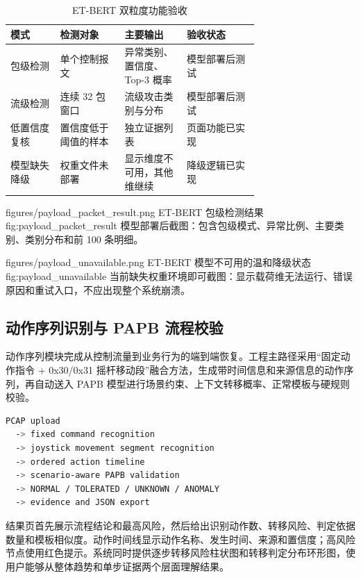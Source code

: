 \begin{table}[H]
\centering
\caption{ET-BERT 双粒度功能验收}
\label{tab:etbert_function}
\small
\begin{tabularx}{\linewidth}{p{0.20\linewidth}p{0.26\linewidth}p{0.25\linewidth}X}
\toprule
\textbf{模式} & \textbf{检测对象} & \textbf{主要输出} & \textbf{验收状态} \\
\midrule
包级检测 & 单个控制报文 & 异常类别、置信度、Top-3 概率 & 模型部署后测试 \\
流级检测 & 连续 32 包窗口 & 流级攻击类别与分布 & 模型部署后测试 \\
低置信度复核 & 置信度低于阈值的样本 & 独立证据列表 & 页面功能已实现 \\
模型缺失降级 & 权重文件未部署 & 显示维度不可用，其他维继续 & 降级逻辑已实现 \\
\bottomrule
\end{tabularx}
\end{table}

\RobotSecFigure
  {figures/payload_packet_result.png}
  {ET-BERT 包级检测结果}
  {fig:payload_packet_result}
  {模型部署后截图：包含包级模式、异常比例、主要类别、类别分布和前 100 条明细。}

\RobotSecFigure
  {figures/payload_unavailable.png}
  {ET-BERT 模型不可用的温和降级状态}
  {fig:payload_unavailable}
  {当前缺失权重环境即可截图：显示载荷维无法运行、错误原因和重试入口，不应出现整个系统崩溃。}

\subsection{动作序列识别与 PAPB 流程校验}
\label{subsec:motion_papb}

动作序列模块完成从控制流量到业务行为的端到端恢复。工程主路径采用“固定动作指令 + 0x30/0x31 摇杆移动段”融合方法，生成带时间信息和来源信息的动作序列，再自动送入 PAPB 模型进行场景约束、上下文转移概率、正常模板与硬规则校验。

\begin{lstlisting}[language=bash,caption={动作序列与 PAPB 联合检测流程}]
PCAP upload
  -> fixed command recognition
  -> joystick movement segment recognition
  -> ordered action timeline
  -> scenario-aware PAPB validation
  -> NORMAL / TOLERATED / UNKNOWN / ANOMALY
  -> evidence and JSON export
\end{lstlisting}

结果页首先展示流程结论和最高风险，然后给出识别动作数、转移风险、判定依据数量和模板相似度。动作时间线显示动作名称、发生时间、来源和置信度；高风险节点使用红色提示。系统同时提供逐步转移风险柱状图和转移判定分布环形图，使用户能够从整体趋势和单步证据两个层面理解结果。

